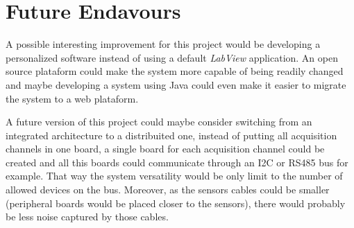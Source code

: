 	\section{Future Endavours}\label{sec:future-endavours}
		A possible interesting improvement for this project would be developing a personalized software instead of using a default \textit{LabView} application. An open source plataform could make the system more capable of being readily changed and maybe developing a system using Java could even make it easier to migrate the system to a web plataform.
		\par
		A future version of this project could maybe consider switching from an integrated architecture to a distribuited one, instead of putting all acquisition channels in one board, a single board for each acquisition channel could be created and all this boards could communicate through an I2C or RS485 bus for example. That way the system versatility would be only limit to the number of allowed devices on the bus. Moreover, as the sensors cables could be smaller (peripheral boards would be placed closer to the sensors), there would probably be less noise captured by those cables.

